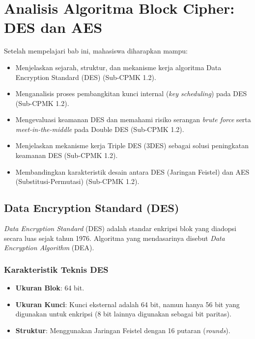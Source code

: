 \documentclass[../main.tex]{subfiles}
\begin{document}
\chapter{Analisis Algoritma Block Cipher: DES dan AES}

\begin{learningoutcome}
Setelah mempelajari bab ini, mahasiswa diharapkan mampu:
\begin{itemize}
    \item Menjelaskan sejarah, struktur, dan mekanisme kerja algoritma Data Encryption Standard (DES) (Sub-CPMK 1.2).
    \item Menganalisis proses pembangkitan kunci internal (\textit{key scheduling}) pada DES (Sub-CPMK 1.2).
    \item Mengevaluasi keamanan DES dan memahami risiko serangan \textit{brute force} serta \textit{meet-in-the-middle} pada Double DES (Sub-CPMK 1.2).
    \item Menjelaskan mekanisme kerja Triple DES (3DES) sebagai solusi peningkatan keamanan DES (Sub-CPMK 1.2).
    \item Membandingkan karakteristik desain antara DES (Jaringan Feistel) dan AES (Substitusi-Permutasi) (Sub-CPMK 1.2).
\end{itemize}
\end{learningoutcome}

\section{Data Encryption Standard (DES)}
\textit{Data Encryption Standard} (DES) adalah standar enkripsi blok yang diadopsi secara luas sejak tahun 1976. Algoritma yang mendasarinya disebut \textit{Data Encryption Algorithm} (DEA).

\subsection{Karakteristik Teknis DES}
\begin{itemize}
    \item \textbf{Ukuran Blok}: 64 bit.
    \item \textbf{Ukuran Kunci}: Kunci eksternal adalah 64 bit, namun hanya 56 bit yang digunakan untuk enkripsi (8 bit lainnya digunakan sebagai bit paritas).
    \item \textbf{Struktur}: Menggunakan Jaringan Feistel dengan 16 putaran (\textit{rounds}).
\end{itemize}
\end{document}
